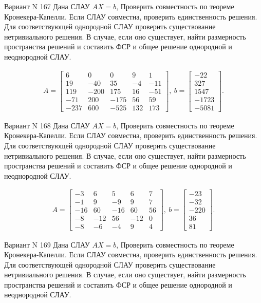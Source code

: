 \documentclass[11pt]{report}
\begin{document}
Вариант N 167
Дана СЛАУ $AX = b$,
Проверить совместность по теореме Кронекера-Капелли. Если СЛАУ совместна, проверить единственность решения.
Для соответствующей однородной СЛАУ проверить существование нетривиального решения. В случае, если оно существует,
найти размерность пространства решений и составить ФСР и общее решение однородной  и неоднородной СЛАУ.


\begin{align*}
 A = \left[\begin{matrix}6 & 0 & 0 & 9 & 1\\19 & -40 & 35 & -4 & -11\\119 & -200 & 175 & 16 & -51\\-71 & 200 & -175 & 56 & 59\\-237 & 600 & -525 & 132 & 173\end{matrix}\right],
\ b = \left[\begin{matrix}-22\\327\\1547\\-1723\\-5081\end{matrix}\right]. 
 \end{align*}

Вариант N 168
Дана СЛАУ $AX = b$,
Проверить совместность по теореме Кронекера-Капелли. Если СЛАУ совместна, проверить единственность решения.
Для соответствующей однородной СЛАУ проверить существование нетривиального решения. В случае, если оно существует,
найти размерность пространства решений и составить ФСР и общее решение однородной  и неоднородной СЛАУ.


\begin{align*}
 A = \left[\begin{matrix}-3 & 6 & 5 & 6 & 7\\-1 & 9 & -9 & 9 & 7\\-16 & 60 & -16 & 60 & 56\\-8 & -12 & 56 & -12 & 0\\-8 & -6 & -4 & 9 & 4\end{matrix}\right],
\ b = \left[\begin{matrix}-23\\-32\\-220\\36\\81\end{matrix}\right]. 
 \end{align*}

Вариант N 169
Дана СЛАУ $AX = b$,
Проверить совместность по теореме Кронекера-Капелли. Если СЛАУ совместна, проверить единственность решения.
Для соответствующей однородной СЛАУ проверить существование нетривиального решения. В случае, если оно существует,
найти размерность пространства решений и составить ФСР и общее решение однородной  и неоднородной СЛАУ.
\end{document}
